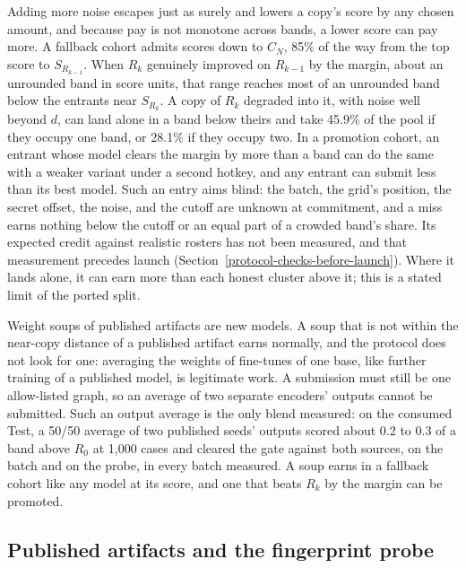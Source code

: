 Adding more noise escapes just as surely and lowers a copy's score by any chosen amount,
and because pay is not monotone across bands, a lower score can pay more. A
fallback cohort admits scores down to \(C_N\), 85\% of the way from the top
score to \(S_{R_{k-1}}\). When \(R_k\) genuinely improved on \(R_{k-1}\) by the
margin, about an unrounded band in score units, that range reaches most of an
unrounded band below the
entrants near \(S_{R_k}\). A copy of \(R_k\) degraded into it, with noise well
beyond \(d\), can land alone in a band below theirs and take 45.9\% of the pool
if they occupy one band, or 28.1\% if they occupy two. In a promotion cohort, an
entrant whose model clears the margin by more than a band can do the same with a
weaker variant under a second hotkey, and any entrant can submit less than its
best model. Such an entry aims blind: the batch, the grid's position, the secret
offset, the noise, and the cutoff are unknown at commitment, and a miss earns
nothing below the cutoff or an equal part of a crowded band's share. Its expected credit against realistic rosters has
not been measured, and that measurement precedes launch
(Section~\ref{protocol-checks-before-launch}). Where it lands alone, it can earn
more than each honest cluster above it; this is a stated limit of the ported
split.

Weight soups of published artifacts are new models. A soup that is not within
the near-copy distance of a published artifact earns normally, and the protocol
does not look for one: averaging the weights of fine-tunes of one base, like
further training of a published model, is legitimate work. A submission must
still be one allow-listed graph, so an average of two separate encoders' outputs
cannot be submitted. Such an output average is the only blend measured: on the
consumed Test, a 50/50 average of two published seeds' outputs scored about 0.2
to 0.3 of a band above \(R_0\) at 1,000 cases and cleared the gate against both
sources, on the batch and on the probe, in every batch measured. A soup earns in
a fallback cohort like any model at its score, and one that beats \(R_k\) by the
margin can be promoted.

\subsection{Published artifacts and the fingerprint probe}\label{public-copies}

